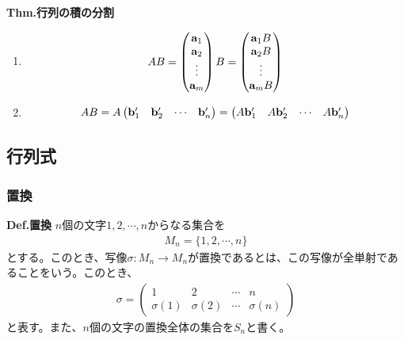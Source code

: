 \documentclass[a4paper,11pt]{jsarticle}
\numberwithin{equation}{section}
\begin{document}
\begin{itembox}[l]{\textbf{Thm.行列の積の分割}}
\begin{enumerate}
\begin{align}
\begin{pmatrix}
      \vb{a}'_2 \vb{b}_1 & \vb{a}'_2 \vb{b}_2 & \cdots & \vb{a}'_2 \vb{b}_n\\
      \vdots & \vdots & \ddots & \vdots\\
      \vb{a}'_m \vb{b}_1 & \vb{a}'_m \vb{b}_2 & \cdots & \vb{a}'_m \vb{b}_n
    \end{pmatrix}
  \end{align}%
  \item 
  \begin{align}
    AB = \begin{pmatrix}
      \vb{a}_1\\
      \vb{a}_2\\
      \vdots\\
      \vb{a}_m
    \end{pmatrix}
    B
    =
    \begin{pmatrix}
      \vb{a}_1 B\\
      \vb{a}_2 B\\
      \vdots\\
      \vb{a}_m B
    \end{pmatrix}
  \end{align}
  \item
  \begin{align}
    AB = A
    \begin{pmatrix}
      \vb{b}'_1 & \vb{b}'_2 & \cdots & \vb{b}'_n
    \end{pmatrix}
    =
    \begin{pmatrix}
      A \vb{b}'_1 & A \vb{b}'_2 & \cdots & A \vb{b}'_n
    \end{pmatrix}
  \end{align}
  \end{enumerate}
\end{itembox}

\subsection{行列式}
\subsubsection{置換}
\begin{itembox}[l]{\textbf{Def.置換}}
  $n$個の文字$1,2,\cdots,n$からなる集合を
  \begin{align}
    M_n = \{1,2,\cdots,n\}
  \end{align}
  とする。このとき、写像$\sigma:M_n \to M_n$が置換であるとは、この写像が全単射であることをいう。このとき、
  \begin{align}
    \sigma = \begin{pmatrix}
      1 & 2 & \cdots & n\\
      \sigma(1) & \sigma(2) & \cdots & \sigma(n)
    \end{pmatrix}
  \end{align}
  と表す。また、$n$個の文字の置換全体の集合を$S_n$と書く。
\end{itembox}
\end{document}
